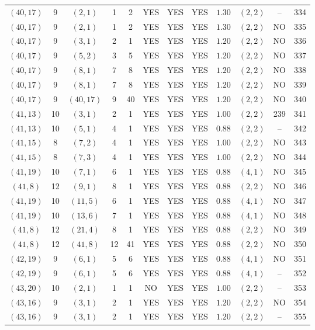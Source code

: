 \begin{longtable}{|c|c|c|c|c|c|c|c|c|c|c|c|}
$(40,17)$ & 9 & $(2,1)$ & 1 & 2 & YES & YES & YES & $1.30$ & $(2,2)$ & -- & 334\\
$(40,17)$ & 9 & $(2,1)$ & 1 & 2 & YES & YES & YES & $1.30$ & $(2,2)$ & NO & 335\\
$(40,17)$ & 9 & $(3,1)$ & 2 & 1 & YES & YES & YES & $1.20$ & $(2,2)$ & NO & 336\\
$(40,17)$ & 9 & $(5,2)$ & 3 & 5 & YES & YES & YES & $1.20$ & $(2,2)$ & NO & 337\\
$(40,17)$ & 9 & $(8,1)$ & 7 & 8 & YES & YES & YES & $1.20$ & $(2,2)$ & NO & 338\\
$(40,17)$ & 9 & $(8,1)$ & 7 & 8 & YES & YES & YES & $1.20$ & $(2,2)$ & NO & 339\\
$(40,17)$ & 9 & $(40,17)$ & 9 & 40 & YES & YES & YES & $1.20$ & $(2,2)$ & NO & 340\\
$(41,13)$ & 10 & $(3,1)$ & 2 & 1 & YES & YES & YES & $1.00$ & $(2,2)$ & 239 & 341\\
$(41,13)$ & 10 & $(5,1)$ & 4 & 1 & YES & YES & YES & $0.88$ & $(2,2)$ & -- & 342\\
$(41,15)$ & 8 & $(7,2)$ & 4 & 1 & YES & YES & YES & $1.00$ & $(2,2)$ & NO & 343\\
$(41,15)$ & 8 & $(7,3)$ & 4 & 1 & YES & YES & YES & $1.00$ & $(2,2)$ & NO & 344\\
$(41,19)$ & 10 & $(7,1)$ & 6 & 1 & YES & YES & YES & $0.88$ & $(4,1)$ & NO & 345\\
$(41,8)$ & 12 & $(9,1)$ & 8 & 1 & YES & YES & YES & $0.88$ & $(2,2)$ & NO & 346\\
$(41,19)$ & 10 & $(11,5)$ & 6 & 1 & YES & YES & YES & $0.88$ & $(4,1)$ & NO & 347\\
$(41,19)$ & 10 & $(13,6)$ & 7 & 1 & YES & YES & YES & $0.88$ & $(4,1)$ & NO & 348\\
$(41,8)$ & 12 & $(21,4)$ & 8 & 1 & YES & YES & YES & $0.88$ & $(2,2)$ & NO & 349\\
$(41,8)$ & 12 & $(41,8)$ & 12 & 41 & YES & YES & YES & $0.88$ & $(2,2)$ & NO & 350\\
$(42,19)$ & 9 & $(6,1)$ & 5 & 6 & YES & YES & YES & $0.88$ & $(4,1)$ & NO & 351\\
$(42,19)$ & 9 & $(6,1)$ & 5 & 6 & YES & YES & YES & $0.88$ & $(4,1)$ & -- & 352\\
$(43,20)$ & 10 & $(2,1)$ & 1 & 1 & NO & YES & YES & $1.00$ & $(2,2)$ & -- & 353\\
$(43,16)$ & 9 & $(3,1)$ & 2 & 1 & YES & YES & YES & $1.20$ & $(2,2)$ & NO & 354\\
$(43,16)$ & 9 & $(3,1)$ & 2 & 1 & YES & YES & YES & $1.20$ & $(2,2)$ & -- & 355\\

\end{longtable}
